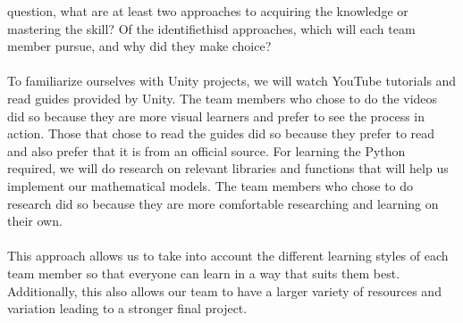 \documentclass[12pt]{article}
\begin{document}
\begin{enumerate}
  question, what are at least two approaches to acquiring the knowledge or
  mastering the skill?  Of the identifiethisd approaches, which will each team
  member pursue, and why did they make  choice?
  \\\\
  To familiarize ourselves with Unity projects, we will watch YouTube tutorials and read guides provided by Unity.
  The team members who chose to do the videos did so because they are more visual learners and prefer to see the process in action.
  Those that chose to read the guides did so because they prefer to read and also prefer that it is from an official source.
  For learning the Python required, we will do research on relevant libraries and functions that will help us implement our mathematical models.
  The team members who chose to do research did so because they are more comfortable researching and learning on their own.
  \\\\
  This approach allows us to take into account the different learning styles of each team member so that everyone can learn in a way that suits them best. 
  Additionally, this also allows our team to have a larger variety of resources and variation leading to a stronger final project.

\end{enumerate}
\end{document}
